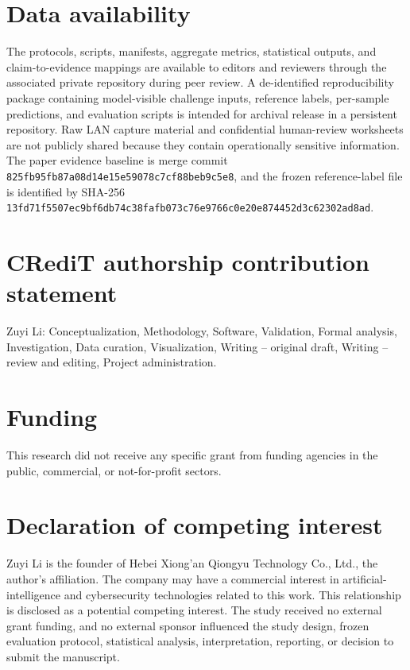 \documentclass[preprint,12pt,authoryear]{elsarticle}
\newcommand{\commitid}{\texttt{825fb95f\allowbreak b87a08d1\allowbreak 4e15e590\allowbreak 78c7cf88\allowbreak beb9c5e8}}
\newcommand{\labelhash}{\texttt{13fd71f5\allowbreak 507ec9bf\allowbreak 6db74c38\allowbreak fafb073c\allowbreak 76e9766c\allowbreak 0e20e874\allowbreak 452d3c62\allowbreak 302ad8ad}}
\begin{document}
\linenumbers










\section*{Data availability}
The protocols, scripts, manifests, aggregate metrics, statistical outputs, and claim-to-evidence mappings are available to editors and reviewers through the associated private repository during peer review. A de-identified reproducibility package containing model-visible challenge inputs, reference labels, per-sample predictions, and evaluation scripts is intended for archival release in a persistent repository. Raw LAN capture material and confidential human-review worksheets are not publicly shared because they contain operationally sensitive information. The paper evidence baseline is merge commit \commitid, and the frozen reference-label file is identified by SHA-256 \labelhash.

\section*{CRediT authorship contribution statement}
Zuyi Li: Conceptualization, Methodology, Software, Validation, Formal analysis, Investigation, Data curation, Visualization, Writing -- original draft, Writing -- review and editing, Project administration.

\section*{Funding}
This research did not receive any specific grant from funding agencies in the public, commercial, or not-for-profit sectors.

\section*{Declaration of competing interest}
Zuyi Li is the founder of Hebei Xiong'an Qiongyu Technology Co., Ltd., the author's affiliation. The company may have a commercial interest in artificial-intelligence and cybersecurity technologies related to this work. This relationship is disclosed as a potential competing interest. The study received no external grant funding, and no external sponsor influenced the study design, frozen evaluation protocol, statistical analysis, interpretation, reporting, or decision to submit the manuscript.
\end{document}
